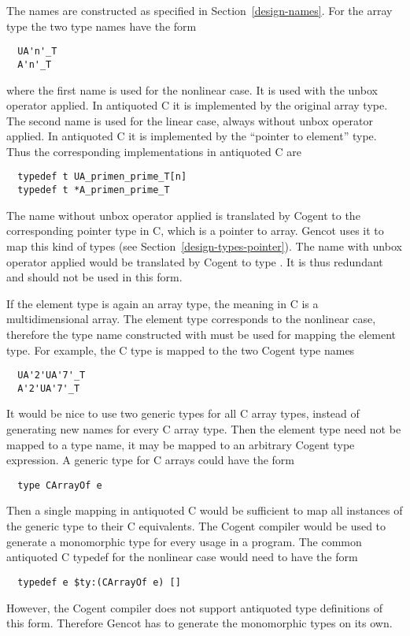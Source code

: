 The names are constructed as specified in Section~\ref{design-names}. For the array type  the two
type names have the form
\begin{verbatim}
  UA'n'_T
  A'n'_T
\end{verbatim}
where the first name is used for the nonlinear case. It is used with the unbox operator applied.
In antiquoted C it is implemented by the original array type. The second name is used for the linear
case, always without unbox operator applied. In antiquoted C it is implemented by the ``pointer to
element'' type. Thus the corresponding implementations in antiquoted C are
\begin{verbatim}
  typedef t UA_primen_prime_T[n]
  typedef t *A_primen_prime_T
\end{verbatim}

The name  without unbox operator applied is translated by Cogent to the corresponding 
pointer type in C, which is a pointer to array. Gencot uses it to map this kind of types (see 
Section~\ref{design-types-pointer}).
The name  with unbox operator applied would be translated by Cogent to type .
It is thus redundant and should not be used in this form.

If the element type  is again an array type, the meaning in C is a multidimensional array. The
element type corresponds to the nonlinear case, therefore the type name constructed with 
must be used for mapping the element type. For example, the C type  is mapped to the
two Cogent type names
\begin{verbatim}
  UA'2'UA'7'_T
  A'2'UA'7'_T
\end{verbatim}

It would be nice to use two generic types for all C array types, instead of generating new names for every 
C array type. Then the element type need not be mapped to a type name, it may be mapped
to an arbitrary Cogent type expression. A generic type for
C arrays could have the form
\begin{verbatim}
  type CArrayOf e
\end{verbatim}
Then a single mapping in antiquoted C would be sufficient to map all instances of the generic type to their 
C equivalents. The Cogent compiler would be used to generate a monomorphic type for every usage in a program. 
The common antiquoted C typedef for the nonlinear case would need to have the form 
\begin{verbatim}
  typedef e $ty:(CArrayOf e) []
\end{verbatim}
However, the Cogent compiler does not support antiquoted type definitions of this form. Therefore Gencot has to
generate the monomorphic types on its own. 

